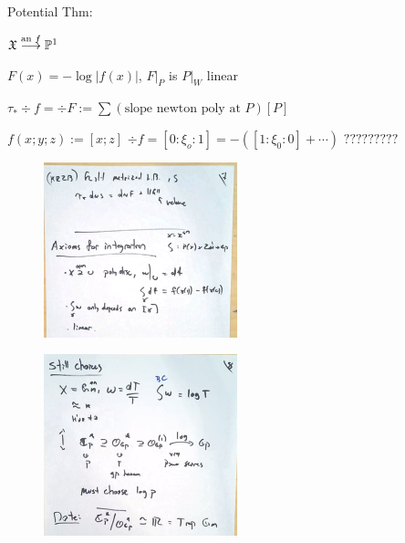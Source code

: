 Potential Thm:

$\mathfrak{X} \stackrel{\text{an }f}{\longrightarrow} \mathbb{P}^1$

$F(x)= - \log|f(x)|$, $F \big|_P$ is $P \big|_W$ linear


\begin{thm}
$\tau_* \div f= \div F:= \sum (\text{slope newton poly at }P) [P]$
\end{thm}


\begin{ex}
$f(x;y;z):= [x;z]$
$\div f= [0 \colon \xi_o \colon 1]= -([1 \colon \xi_0 \colon 0] + \cdots)$
$?????????$



	\begin{figure}[!ht]
	\centering
	\includegraphics[width=0.5\textwidth]{../images/im40.png}
	\end{figure}
\end{ex}


	\begin{figure}[!ht]
	\centering
	\includegraphics[width=0.5\textwidth]{../images/im41.png}
	\end{figure}


